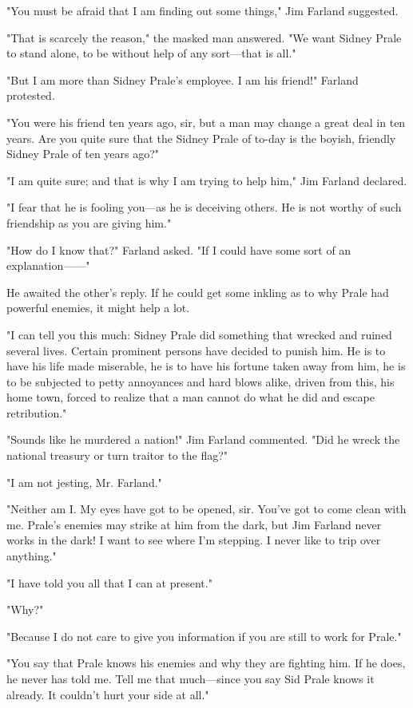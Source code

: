 \documentclass{novel}
\begin{document}
"You must be afraid that I am finding out some things," Jim Farland suggested.

"That is scarcely the reason," the masked man answered. "We want Sidney Prale to stand alone, to be without help of any sort---that is all."

"But I am more than Sidney Prale's employee. I am his friend!" Farland protested.

"You were his friend ten years ago, sir, but a man may change a great deal in ten years. Are you quite sure that the Sidney Prale of to-day is the boyish, friendly Sidney Prale of ten years ago?"

"I am quite sure; and that is why I am trying to help him," Jim Farland declared.

"I fear that he is fooling you---as he is deceiving others. He is not worthy of such friendship as you are giving him."

"How do I know that?" Farland asked. "If I could have some sort of an explanation------"

He awaited the other's reply. If he could get some inkling as to why Prale had powerful enemies, it might help a lot.

"I can tell you this much: Sidney Prale did something that wrecked and ruined several lives. Certain prominent persons have decided to punish him. He is to have his life made miserable, he is to have his fortune taken away from him, he is to be subjected to petty annoyances and hard blows alike, driven from this, his home town, forced to realize that a man cannot do what he did and escape retribution."

"Sounds like he murdered a nation!" Jim Farland commented. "Did he wreck the national treasury or turn traitor to the flag?"

"I am not jesting, Mr. Farland."

"Neither am I. My eyes have got to be opened, sir. You've got to come clean with me. Prale's enemies may strike at him from the dark, but Jim Farland never works in the dark! I want to see where I'm stepping. I never like to trip over anything."

"I have told you all that I can at present."

"Why?"

"Because I do not care to give you information if you are still to work for Prale."

"You say that Prale knows his enemies and why they are fighting him. If he does, he never has told me. Tell me that much---since you say Sid Prale knows it already. It couldn't hurt your side at all."
\end{document}
